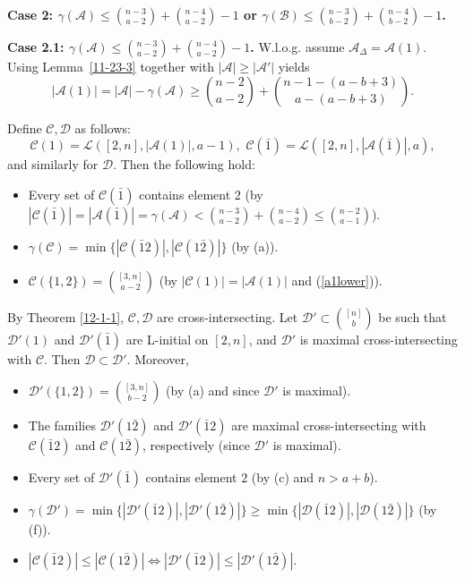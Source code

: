 \documentclass[11pt]{article}
\def\marrow{{\boldmath {\marginpar[\hfill$\rightarrow \rightarrow$]{$\leftarrow \leftarrow$}}}}
\def\andrey#1{{\sc Andrey: }{\marrow\sf \textcolor{blue}{#1}}}
\newcommand{\m}{\mathcal}
\begin{document}
{\bf Case 2:
$
\gamma(\mathcal{A})\le {n-3\choose a-2}+{n-4\choose a-2}-1$ or $\gamma(\mathcal{B})\le {n-3\choose b-2}+{n-4\choose b-2}-1$.}


{\bf Case 2.1: 
$\gamma(\mathcal{A})\le {n-3\choose a-2}+{n-4\choose a-2}-1$.} 
W.l.o.g. assume $\m A_{\Delta}=\m A(1)$.
Using Lemma~\ref{11-23-3} together with $|\mathcal{A}|\ge|\mathcal{A}'|$ yields
\begin{equation}\label{a1lower}
    |\m A(1)|=|\mathcal{A}|-\gamma(\m A)\ge\binom{n-2}{a-2}+\binom{n-1-(a-b+3)}{a-(a-b+3)}.
\end{equation}

Define $\mathcal{C}, \mathcal{D}$ as follows: 
$$\mathcal{C}(1)=\mathcal{L}([2,n],|\mathcal{A}(1)|, a-1), \,\,\mathcal{C}(\bar{1})=\mathcal{L}([2,n],|\mathcal{A}(\bar{1})|, a),$$ 
and similarly for $\mathcal{D}$. Then the following hold:
\begin{itemize}
    \item[(a)] Every set of $\mathcal{C}(\bar{1})$ contains element $2$ (by $|\m C(\bar{1})|=|\m A(\bar1)|=\gamma(\m A)<{n-3\choose a-2}+{n-4\choose a-2}\le {n-2\choose a-1}$).
    \item[(b)] $\gamma(\mathcal{C})=\min \{|\mathcal{C}(\bar12)|, |\mathcal{C}(1\bar{2})|\}$ (by (a)). 
    \item[(c)] $\mathcal{C}(\{1,2\})={[3,n]\choose a-2}$ (by $|\m C(1)|=|\m A(1)|$ and (\ref{a1lower})). 
\end{itemize}

By Theorem \ref{12-1-1}, $\mathcal{C}, \mathcal{D}$ are cross-intersecting.
Let $\mathcal{D}'\subset {[n]\choose b}$ be such that 
$\m D'(1)$ and $\m D'(\bar1)$ are L-initial on $[2,n]$, and 
$\m D'$ is maximal cross-intersecting with $\m C$.  
Then $\mathcal{D}\subset \mathcal{D}'$. Moreover, 
\begin{itemize}
    \item[(d)] $\mathcal{D}'(\{1,2\})={[3,n]\choose b-2}$ (by (a) and since $\m D'$ is maximal).
    \item[(e)] The families $\mathcal{D}'(1\bar{2})$ and $ \mathcal{D}'(\bar{1}2)$ are maximal cross-intersecting with $\mathcal{C}(\bar{1}2)$ and $\mathcal{C}(1\bar{2})$, respectively (since $\m D'$ is maximal).
    \item[(f)] Every set of $\mathcal{D}'(\bar{1})$ contains element $2$ (by (c) and $n>a+b$).
    \item[(g)] $\gamma(\mathcal{D}')= \min \{ |\mathcal{D}'(\bar{1}2)|, |\mathcal{D}'(1\bar{2})|\}\ge \min \{ |\mathcal{D}(\bar{1}2)|, |\mathcal{D}(1\bar{2})|\}$ (by (f)). %
    \item[(h)] $|\mathcal{C}(\bar12)|\le |\mathcal{C}(1\bar{2})| \Leftrightarrow|\mathcal{D}'(\bar{1}2)|\le |\mathcal{D}'(1\bar{2})|$.
\end{itemize}
\end{document}
